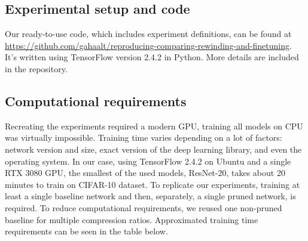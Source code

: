\subsection{Experimental setup and code}


Our ready-to-use code, which includes experiment definitions, can be found at 
\url{https://github.com/gahaalt/reproducing-comparing-rewinding-and-finetuning}.
It's written using TensorFlow \cite{tensorflow} version 2.4.2 in Python. More details are included in the repository.

\subsection{Computational requirements}

Recreating the experiments required a modern GPU, training all models on CPU was virtually impossible. Training time varies depending on a lot of factors: network version and size, exact version of the deep learning library, and even the operating system. In our case, using TensorFlow 2.4.2 on Ubuntu and a single RTX 3080 GPU, the smallest of the used models, ResNet-20, takes about 20 minutes to train on CIFAR-10 dataset. To replicate our experiments, training at least a single baseline network and then, separately, a single pruned network, is required. To reduce computational requirements, we reused one non-pruned baseline for multiple compression ratios. Approximated training time requirements can be seen in the table below.

